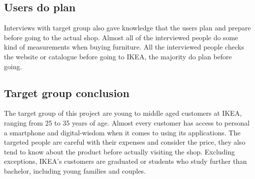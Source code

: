\subsection{Users do plan}
Interviews with target group also gave knowledge that the users plan and prepare before going to the actual shop. Almost all of the interviewed people do some kind of measurements when buying furniture. All the interviewed people checks the website or catalogue before going to IKEA, the majority do plan before going. 

\subsection{Target group conclusion}
The target group of this project are young to middle aged customers at IKEA, ranging from 25 to 35 years of age.  Almost every customer has access to personal a smartphone and digital-wisdom when it comes to using its applications. The targeted people are careful with their expenses and consider the price, they also tend to know about the product before actually visiting the shop. Excluding exceptions, IKEA's customers are graduated or students who study further than bachelor, including young families and couples.

